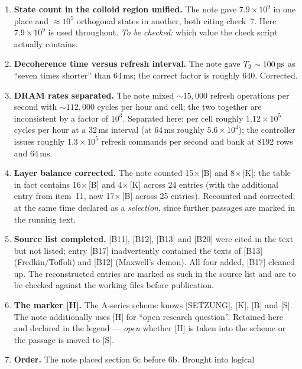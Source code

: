 \documentclass[11pt,a4paper]{article}
\begin{document}
\begin{enumerate}[leftmargin=1.6em,itemsep=0.4em]
  \item \textbf{State count in the colloid region unified.} The note gave
        $7.9\times10^{9}$ in one place and ${\approx}10^{5}$ orthogonal states in
        another, both citing check~7. Here $7.9\times10^{9}$ is used throughout.
        \emph{To be checked:} which value the check script actually contains.
  \item \textbf{Decoherence time versus refresh interval.} The note gave
        $T_2 \sim 100\,\text{\textmu s}$ as “seven times shorter” than 64\,ms; the
        correct factor is roughly 640. Corrected.
  \item \textbf{DRAM rates separated.} The note mixed ${\sim}15{,}000$ refresh
        operations per second with ${\sim}112{,}000$ cycles per hour and cell; the
        two together are inconsistent by a factor of $10^{3}$. Separated here: per
        cell roughly $1.12\times10^{5}$ cycles per hour at a 32\,ms interval (at
        64\,ms roughly $5.6\times10^{4}$); the controller issues roughly
        $1.3\times10^{5}$ refresh commands per second and bank at 8192 rows and
        64\,ms.
  \item \textbf{Layer balance corrected.} The note counted 15$\times$\,[B] and
        8$\times$\,[K]; the table in fact contains 16$\times$\,[B] and
        4$\times$\,[K] across 24 entries (with the additional entry from item~11,
        now 17$\times$\,[B] across 25 entries). Recounted and corrected; at the same
        time declared as a \emph{selection}, since further passages are marked in
        the running text.
  \item \textbf{Source list completed.} [B11], [B12], [B13] and [B20] were cited
        in the text but not listed; entry [B17] inadvertently contained the texts
        of [B13] (Fredkin/Toffoli) and [B12] (Maxwell's demon). All four added,
        [B17] cleaned up. The reconstructed entries are marked as such in the
        source list and are to be checked against the working files before
        publication.
  \item \textbf{The marker [H].} The A-series scheme knows [SETZUNG], [K], [B] and
        [S]. The note additionally uses [H] for “open research question”. Retained
        here and declared in the legend --- \emph{open} whether [H] is taken into
        the scheme or the passage is moved to [S].
  \item \textbf{Order.} The note placed section 6c before 6b. Brought into logical

\end{enumerate}
\end{document}
